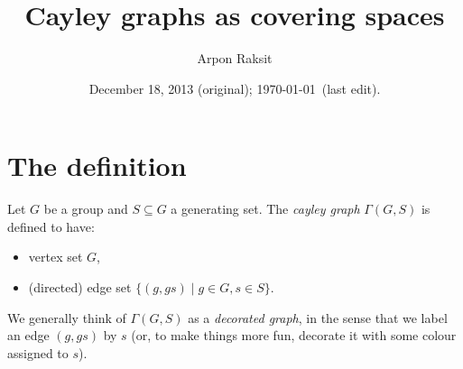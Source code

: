 


\usetikzlibrary{decorations.markings}
\usetikzlibrary{arrows,positioning}


\title{Cayley graphs as covering spaces}
\author{Arpon Raksit}
\date{December 18, 2013 (original); \today\ (last edit).}


\maketitle
\thispagestyle{fancy}


\section{The definition}

\begin{definition}
  Let $G$ be a group and $S \subseteq G$ a generating set. The
  \emph{cayley graph} $\Gamma(G,S)$ is defined to have:
  \begin{itemize}
  \item vertex set $G$,
  \item (directed) edge set $\{(g,gs) \mid g \in G, s \in S\}$.
  \end{itemize}
\end{definition}

\begin{remark}
  We generally think of $\Gamma(G,S)$ as a \emph{decorated graph}, in
  the sense that we label an edge $(g,gs)$ by $s$ (or, to make things
  more fun, decorate it with some colour assigned to $s$).
\end{remark}

